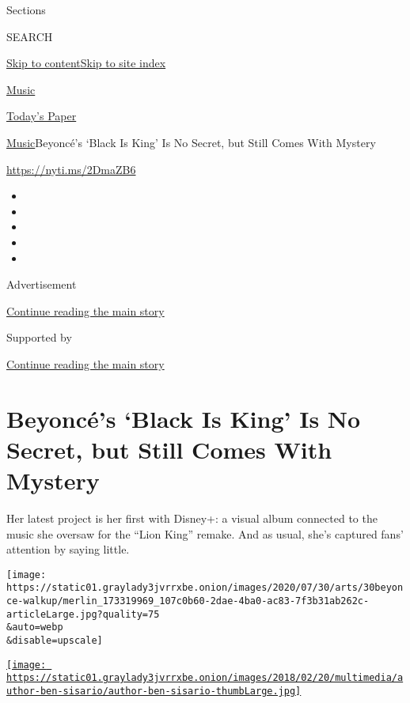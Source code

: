 Sections

SEARCH

\protect\hyperlink{site-content}{Skip to
content}\protect\hyperlink{site-index}{Skip to site index}

\href{https://www.nytimes3xbfgragh.onion/section/arts/music}{Music}

\href{https://myaccount.nytimes3xbfgragh.onion/auth/login?response_type=cookie\&client_id=vi}{}

\href{https://www.nytimes3xbfgragh.onion/section/todayspaper}{Today's
Paper}

\href{/section/arts/music}{Music}\textbar{}Beyoncé's `Black Is King' Is
No Secret, but Still Comes With Mystery

\url{https://nyti.ms/2DmaZB6}

\begin{itemize}
\item
\item
\item
\item
\item
\end{itemize}

Advertisement

\protect\hyperlink{after-top}{Continue reading the main story}

Supported by

\protect\hyperlink{after-sponsor}{Continue reading the main story}

\hypertarget{beyoncuxe9s-black-is-king-is-no-secret-but-still-comes-with-mystery}{%
\section{Beyoncé's `Black Is King' Is No Secret, but Still Comes With
Mystery}\label{beyoncuxe9s-black-is-king-is-no-secret-but-still-comes-with-mystery}}

Her latest project is her first with Disney+: a visual album connected
to the music she oversaw for the ``Lion King'' remake. And as usual,
she's captured fans' attention by saying little.

\texttt{[image: https://static01.graylady3jvrrxbe.onion/images/2020/07/30/arts/30beyonce-walkup/merlin\_173319969\_107c0b60-2dae-4ba0-ac83-7f3b31ab262c-articleLarge.jpg?quality=75\\\&auto=webp\\\&disable=upscale]}

\href{https://www.nytimes3xbfgragh.onion/by/ben-sisario}{\texttt{[image: https://static01.graylady3jvrrxbe.onion/images/2018/02/20/multimedia/author-ben-sisario/author-ben-sisario-thumbLarge.jpg]}}

